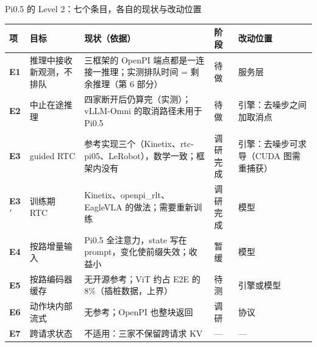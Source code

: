 
\begin{frame}[t]{Pi0.5 的 Level 2：七个条目，各自的现状与改动位置}
\scriptsize
\renewcommand{\arraystretch}{1.05}
\setlength{\tabcolsep}{2.5pt}
\begin{tabularx}{\textwidth}{>{\bfseries}p{1.0cm} p{2.2cm} Y p{1.0cm} p{2.0cm}}
\toprule
{}
项 & 目标 & 现状（依据） & 阶段 & 改动位置 \\
\midrule
E1 & 推理中接收新观测，不排队 & 三框架的 OpenPI 端点都是一连接一推理；实测排队时间 = 剩余推理（第 6 部分） & 待做 & 服务层 \\
E2 & 中止在途推理 & 四家断开后仍算完（实测）；vLLM-Omni 的取消路径未用于 Pi0.5 & 待做 & 引擎：去噪步之间加取消点 \\
E3 & guided RTC & 参考实现三个（Kinetix、rtc-pi05、LeRobot），数学一致；框架内没有 & 调研完成 & 引擎：去噪步可求导（CUDA 图需重捕获） \\
E3$'$ & 训练期 RTC & Kinetix、openpi\_rlt、EagleVLA 的做法；需要重新训练 & 调研完成 & 模型 \\
E4 & 按路增量输入 & Pi0.5 全注意力，state 写在 prompt，变化使前缀失效；收益小 & 暂缓 & 模型 \\
E5 & 按路编码器缓存 & 无开源参考；ViT 约占 E2E 的 8\%（插桩数据，上界） & 待测 & 引擎或模型 \\
E6 & 动作块内部流式 & 无参考；OpenPI 也整块返回 & 调研 & 协议 \\
E7 & 跨请求状态 & 不适用：三家不保留跨请求 KV & — & — \\
\bottomrule
\end{tabularx}
\par{}
\par{}
\end{frame}
